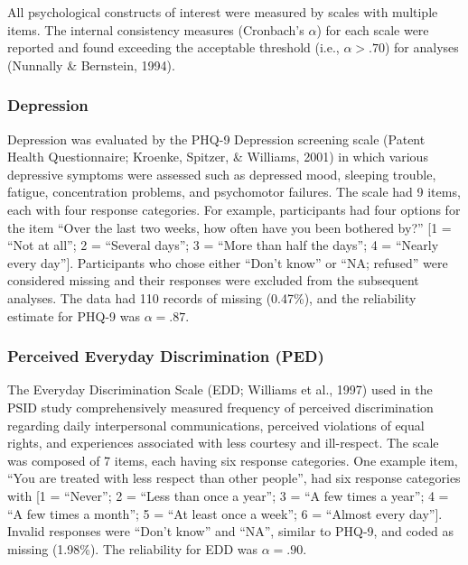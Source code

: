 \documentclass[
  man]{apa7}
\begin{document}
All psychological constructs of interest were measured by scales with multiple items. The internal consistency measures (Cronbach's \(\alpha\)) for each scale were reported and found exceeding the acceptable threshold (i.e., \(\alpha > .70\)) for analyses (Nunnally \& Bernstein, 1994).

\hypertarget{depression}{%
\subsubsection{Depression}\label{depression}}

Depression was evaluated by the PHQ-9 Depression screening scale (Patent Health Questionnaire; Kroenke, Spitzer, \& Williams, 2001) in which various depressive symptoms were assessed such as depressed mood, sleeping trouble, fatigue, concentration problems, and psychomotor failures. The scale had 9 items, each with four response categories. For example, participants had four options for the item ``Over the last two weeks, how often have you been bothered by?'' {[}1 = ``Not at all''; 2 = ``Several days''; 3 = ``More than half the days''; 4 = ``Nearly every day''{]}. Participants who chose either ``Don't know'' or ``NA; refused'' were considered missing and their responses were excluded from the subsequent analyses. The data had 110 records of missing (0.47\%), and the reliability estimate for PHQ-9 was \(\alpha = .87\).

\hypertarget{perceived-everyday-discrimination-ped}{%
\subsubsection{Perceived Everyday Discrimination (PED)}\label{perceived-everyday-discrimination-ped}}

The Everyday Discrimination Scale (EDD; Williams et al., 1997) used in the PSID study comprehensively measured frequency of perceived discrimination regarding daily interpersonal communications, perceived violations of equal rights, and experiences associated with less courtesy and ill-respect. The scale was composed of 7 items, each having six response categories. One example item, ``You are treated with less respect than other people'', had six response categories with {[}1 = ``Never''; 2 = ``Less than once a year''; 3 = ``A few times a year''; 4 = ``A few times a month''; 5 = ``At least once a week''; 6 = ``Almost every day''{]}. Invalid responses were ``Don't know'' and ``NA'', similar to PHQ-9, and coded as missing (1.98\%). The reliability for EDD was \(\alpha = .90\).
\end{document}
